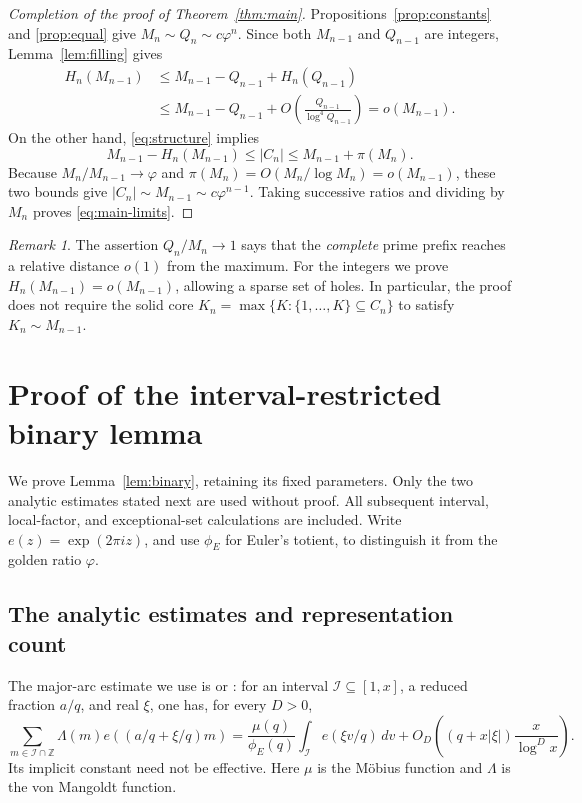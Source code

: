 \documentclass[11pt,letterpaper]{article}
\numberwithin{equation}{section}
\theoremstyle{remark}
\newtheorem{remark}[theorem]{Remark}
\newcommand{\Z}{\mathbb Z}
\newcommand{\ph}{\varphi}
\newcommand{\tot}{\phi_{\!E}}
\newcommand{\ee}[1]{e\!\left(#1\right)}
\begin{document}
\begin{proof}[Completion of the proof of Theorem~\ref{thm:main}]
Propositions~\ref{prop:constants} and \ref{prop:equal} give
$M_n\sim Q_n\sim c\ph^n$. Since both $M_{n-1}$ and $Q_{n-1}$
are integers, Lemma~\ref{lem:filling} gives
\begin{align*}
 H_n(M_{n-1})
 &\le M_{n-1}-Q_{n-1}+H_n(Q_{n-1})\\
 &\le M_{n-1}-Q_{n-1}
       +O\left(\frac{Q_{n-1}}{\log^4Q_{n-1}}\right)
 =o(M_{n-1}).
\end{align*}
On the other hand, \eqref{eq:structure} implies
\[
 M_{n-1}-H_n(M_{n-1})\le |C_n|\le M_{n-1}+\pi(M_n).
\]
Because $M_n/M_{n-1}\to\ph$ and
$\pi(M_n)=O(M_n/\log M_n)=o(M_{n-1})$, these two bounds give
$|C_n|\sim M_{n-1}\sim c\ph^{n-1}$. Taking successive ratios and
dividing by $M_n$ proves \eqref{eq:main-limits}.
\end{proof}

\begin{remark}
The assertion $Q_n/M_n\to1$ says that the \emph{complete} prime
prefix reaches a relative distance $o(1)$ from the maximum. For the
integers we prove $H_n(M_{n-1})=o(M_{n-1})$, allowing a sparse set
of holes. In particular, the proof does not require the solid core
$K_n=\max\{K:\{1,\ldots,K\}\subseteq C_n\}$ to satisfy
$K_n\sim M_{n-1}$.
\end{remark}

\appendix
\section{Proof of the interval-restricted binary lemma}\label{app:binary}

We prove Lemma~\ref{lem:binary}, retaining its fixed parameters.
Only the two analytic estimates stated next are used without proof.
All subsequent interval, local-factor, and exceptional-set calculations
are included. Write $e(z)=\exp(2\pi iz)$, and use $\tot$ for Euler's
totient, to distinguish it from the golden ratio $\ph$.

\subsection{The analytic estimates and representation count}

The major-arc estimate we use is \cite[Lemma 5 (Major arc estimates)]{LyallRice}  or \cite[Proposition~24]{Tao}:
for an interval $\mathcal I\subseteq[1,x]$, a reduced fraction $a/q$,
and real $\xi$, one has, for every $D>0$,
\begin{equation}\label{eq:tao-input}
 \sum_{m\in\mathcal I\cap\Z}\Lambda(m)
       \ee{(a/q+\xi/q)m}
 =\frac{\mu(q)}{\tot(q)}\int_{\mathcal I}\ee{\xi v/q}\,dv
 +O_D\left((q+x|\xi|)\frac{x}{\log^D x}\right).
\end{equation}
Its implicit constant need not be effective. Here $\mu$ is the
M\"obius function and $\Lambda$ is the von Mangoldt function.
\end{document}
